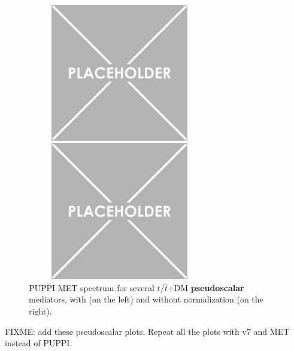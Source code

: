 \documentclass[a4paper, 10pt, openright]{report}
\begin{document}
\begin{figure}[htbp]
\centering
\begin{minipage}[b]{.49\textwidth}
\includegraphics[width=8cm, height=6cm]{figs/placeholder.png}
\end{minipage}\hfill
\begin{minipage}[b]{.49\textwidth}
\includegraphics[width=8cm, height=6cm]{figs/placeholder.png}
\end{minipage} \hfill
\caption{\ac{PUPPI} \ac{MET} spectrum for several $t/\bar t$+DM \textbf{pseudoscalar} mediators, with (on the left) and without normalization (on the right).}
\label{fig:signalSinglePseudo}
\end{figure}

\color{red} FIXME: add these pseudoscalar plots. Repeat all the plots with v7 and MET instead of PUPPI. \color{black}
\end{document}
